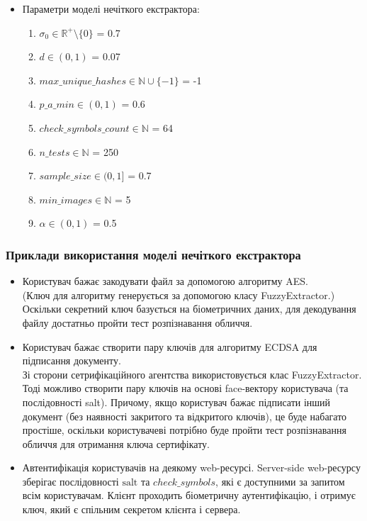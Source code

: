 \documentclass[11pt]{article}
\providecommand{\tightlist}{%
      \setlength{\itemsep}{0pt}\setlength{\parskip}{0pt}}
\begin{document}
    \begin{itemize}
\item
  Параметри моделі нечіткого екстрактора:

  \begin{enumerate}
  \def\labelenumi{\arabic{enumi}.}
  \tightlist
  \item
    \(\sigma_0 \in \mathbb{R}^+\setminus \{0\}\) = 0.7
  \item
    \(d \in (0,1)\) = 0.07
  \item
    \(max\_unique\_hashes \in \mathbb{N}\cup \{-1\}\) = -1
  \item
    \(p\_a\_min \in (0,1)\) = 0.6
  \item
    \(check\_symbols\_count \in \mathbb{N}\) = 64
  \item
    \(n\_tests \in \mathbb{N}\) = 250
  \item
    \(sample\_size \in (0,1]\) = 0.7
  \item
    \(min\_images \in \mathbb{N}\) = 5
  \item
    \(\alpha \in (0,1)\) = 0.5
  \end{enumerate}
\end{itemize}

    \hypertarget{ux43fux440ux438ux43aux43bux430ux434ux438-ux432ux438ux43aux43eux440ux438ux441ux442ux430ux43dux43dux44f}{%
\subsubsection{Приклади
використання моделі нечіткого екстрактора}\label{ux43fux440ux438ux43aux43bux430ux434ux438-ux432ux438ux43aux43eux440ux438ux441ux442ux430ux43dux43dux44f}}

\begin{itemize}
\tightlist
\item
  Користувач бажає закодувати файл за допомогою алгоритму AES.\\
  (Ключ для алгоритму генерується за допомогою класу FuzzyExtractor.)
  Оскільки секретний ключ базується на біометричних даних, для декодування файлу достатньо пройти тест розпізнавання
  обличчя.
  \vspace{1ex}
\item
  Користувач бажає створити пару ключів для алгоритму ECDSA для
  підписання документу.\\
  Зі сторони сетрифікаційного агентства використовується клас
  FuzzyExtractor.\\
  Тоді можливо створити пару ключів на основі face-вектору користувача (та
  послідовності salt). Причому, якщо користувач бажає підписати інший
  документ (без наявності закритого та відкритого ключів), це буде
  набагато простіше, оскільки користувачеві потрібно буде пройти тест
  розпізнавання обличчя для отримання ключа сертифікату.
  \vspace{1ex}
\item
  Автентифікація користувачів на деякому web-ресурсі. Server-side
  web-ресурсу зберігає послідовності
  \(\text{salt}\) та \(check\_symbols\), які є доступними за
  запитом всім користувачам. Клієнт проходить
  біометричну аутентифікацію, і отримує ключ, який є спільним секретом
  клієнта і сервера.
\end{itemize}
\end{document}
